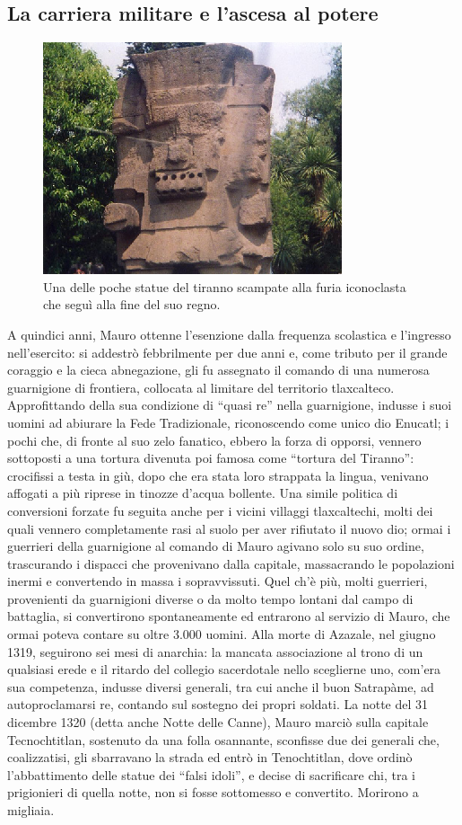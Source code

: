 \documentclass[italian,a4paper]{article}
\begin{document}
 \subsection*{La carriera militare e l'ascesa al potere}
\begin{figure}
    \includegraphics[width=.4\textwidth]{tirannomauro.eps}
    \caption{Una delle poche statue del tiranno scampate alla furia
    iconoclasta che segu\`i alla fine del suo regno.}
\end{figure}
 A quindici anni, Mauro ottenne l'esenzione dalla frequenza scolastica e
 l'ingresso nell'esercito: si addestrò febbrilmente per due anni e, come
 tributo per il grande coraggio e la cieca abnegazione, gli fu assegnato il
 comando di una numerosa guarnigione di frontiera, collocata al limitare del
 territorio tlaxcalteco. Approfittando della sua condizione di ``quasi re''
 nella guarnigione, indusse i suoi uomini ad abiurare la Fede Tradizionale,
 riconoscendo come unico dio Enucatl; i pochi che, di fronte al suo zelo
 fanatico, ebbero la forza di opporsi, vennero sottoposti a una tortura
 divenuta poi famosa come ``tortura del Tiranno'': crocifissi a testa in giù,
 dopo che era stata loro strappata la lingua, venivano affogati a più
 riprese in tinozze d'acqua bollente. Una simile politica di conversioni
 forzate fu seguita anche per i vicini villaggi tlaxcaltechi, molti dei
 quali vennero completamente rasi al suolo per aver rifiutato il nuovo dio;
 ormai i guerrieri della guarnigione al comando di Mauro agivano solo su suo
 ordine, trascurando i dispacci che provenivano dalla capitale, massacrando
 le popolazioni inermi e convertendo in massa i sopravvissuti. Quel ch'è
 più, molti guerrieri, provenienti da guarnigioni diverse o da molto tempo
 lontani dal campo di battaglia, si convertirono spontaneamente ed entrarono
 al servizio di Mauro, che ormai poteva contare su oltre 3.000 uomini.
 Alla morte di Azazale, nel giugno 1319, seguirono sei mesi di anarchia: la
 mancata associazione al trono di un qualsiasi erede e il ritardo del
 collegio sacerdotale nello sceglierne uno, com'era sua competenza, indusse
 diversi generali, tra cui anche il buon Satrapàme, ad autoproclamarsi re,
 contando sul sostegno dei propri soldati. La notte del 31 dicembre 1320
 (detta anche Notte delle Canne), Mauro marciò sulla capitale Tecnochtitlan,
 sostenuto da una folla osannante, sconfisse due dei generali che,
 coalizzatisi, gli sbarravano la strada ed entrò in Tenochtitlan, dove
 ordinò l'abbattimento delle statue dei ``falsi idoli'', e decise di
 sacrificare chi, tra i prigionieri di quella notte, non si fosse sottomesso
 e convertito. Morirono a migliaia.
\end{document}
